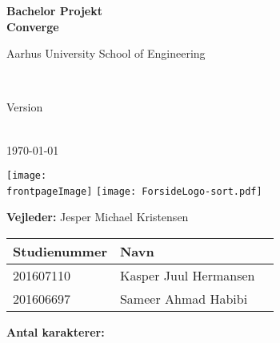 \begin{center}
	{\fontsize{36pt}{0}\selectfont
		\textbf{
		Bachelor Projekt\\
		}
	}
	\vspace{20pt}
	{\fontsize{28pt}{0}\selectfont
		\textbf{
		Converge\\
		}
	}
	\vspace{20pt}

	{\fontsize{14pt}{0}\selectfont
		Aarhus University School of Engineering\\
	}
	\vspace{20pt}

	{\fontsize{24pt}{0}\selectfont
		\thetitle\\
	}
	\vspace{20pt}

	{\fontsize{18pt}{0}\selectfont
		Version \vhCurrentVersion\\
	}
	\vspace{20pt}

	{\fontsize{18pt}{0}\selectfont
		\ifdefined\frontpageDate
			\frontpageDate\\
		\else
			\today\\
		\fi
	}
	\vspace*{\fill}

	\ifdefined\frontpageImage
		\texttt{[image: \\frontpageImage]}
	\else
		\texttt{[image: ForsideLogo-sort.pdf]}
	\fi
	\vspace*{\fill}

	\textbf{Vejleder:} Jesper Michael Kristensen \\
	\vspace{5pt}
	\begin{tabular}{l|ll}
		\textbf{Studienummer} & \textbf{Navn}\\ [5px]
		\hline
		201607110 & Kasper Juul Hermansen\\
		\hline
		201606697 & Sameer Ahmad Habibi \\
	\end{tabular}

	\ifdefined\frontpageCharacters
		\vspace{10pt}
		\textbf{Antal karakterer: } \frontpageCharacters\\
	\fi
	\vspace{30pt}

\end{center}
